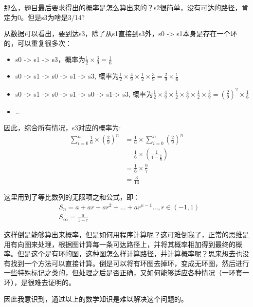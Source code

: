 \documentclass[12pt]{article}
\begin{document}
那么，题目最后要求得出的概率是怎么算出来的？s2很简单，没有可达的路径，肯定为0。但是s3为啥是3/14?

从数据可以看出，要到达s3，除了从s1直接到s3外，s0 -\textgreater{} s1本身是存在一个环的，可以重复很多次：

\begin{itemize}
\tightlist
\item
  s0 -\textgreater{} s1 -\textgreater{} s3，概率为\(\frac{1}{2} \times \frac{3}{9}=\frac{1}{6}\)
\item
  s0 -\textgreater{} s1 -\textgreater{} s0 -\textgreater{} s1 -\textgreater{} s3, 概率为\(\frac{1}{2} \times \frac{4}{9} \times \frac{1}{2} \times \frac{3}{9}=\frac{2}{9} \times \frac{1}{6}\)
\item
  s0 -\textgreater{} s1 -\textgreater{} s0 -\textgreater{} s1 -\textgreater{} s0 -\textgreater{} s1-\textgreater{} s3, 概率为\(\frac{1}{2} \times \frac{4}{9} \times \frac{1}{2} \times \frac{4}{9} \times \frac{1}{2} \times \frac{3}{9}=\left(\frac{2}{9} \right)^2 \times \frac{1}{6}\)
\item
  \ldots{}
\end{itemize}

因此，综合所有情况，s3对应的概率为:
\begin{align}
\sum_{i = 0}^{n}{\frac{1}{6} \times \left(\frac{2}{9} \right)^n} &= \frac{1}{6} \times \sum_{i = 0}^{n}{\left(\frac{2}{9} \right)^n} \\
  &= \frac{1}{6} \times \left(\frac{1}{1-\frac{2}{9}} \right) \\
  &= \frac{1}{6} \times \frac{9}{7} \\
  &= \frac{3}{14}
\end{align}

这里用到了等比数列的无限项之和公式，即：
\begin{align}
&S_{n} = a + ar + ar^2 + ... + ar^{n - 1} ..., r \in (-1, 1) \\
&S_{\infty} = \frac{a}{1 - r}
\end{align}

这样倒是能够算出来概率，但是如何用程序计算呢？这可难倒我了，正常的思维是用有向图来处理，根据图计算每一条可达路径上，并将其概率相加得到最终的概率。但是这个是有环的图，这种图怎么样计算路径，并计算概率呢？思来想去也没有找到一个方法可以直接计算。倒是可以将有环图去掉环，变成无环图，然后进行一些特殊标记之类的，但处理之后是否正确，又如何能够适应各种情况（一环套一环），是很难去证明的。

因此我意识到，通过以上的数学知识是难以解决这个问题的。
\end{document}
